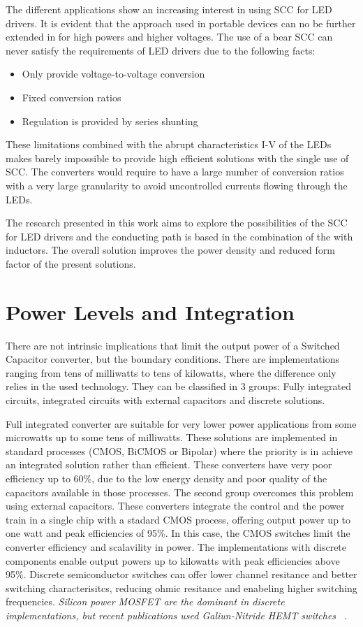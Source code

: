 The different applications show an increasing interest in using SCC for LED drivers. It is evident that the approach used in portable devices can no be further extended in for high powers and higher voltages. The use of a bear SCC can never satisfy the requirements of LED drivers due to the following facts:
\begin{itemize}
  \item Only provide voltage-to-voltage conversion
  \item Fixed conversion ratios
  \item Regulation is provided by series shunting
\end{itemize}
These limitations combined with the abrupt characteristics I-V of the LEDs makes barely impossible to provide high efficient solutions with the single use of SCC. The converters would require to have a large number of conversion ratios with a very large granularity to avoid uncontrolled currents flowing through the LEDs.

The research presented in this work aims to explore the possibilities of the SCC for LED drivers and the conducting path is based in the combination of the with inductors. The overall solution improves the power density and reduced form factor of the present solutions.



\section*{Power Levels and Integration}

There are not intrinsic implications that limit the output power of a Switched Capacitor converter, but the boundary conditions. There are implementations ranging from tens of milliwatts to tens of kilowatts, where the difference only relies in the used technology. They can be classified in 3 groups: Fully integrated circuits, integrated circuits with external capacitors and discrete solutions.

Full integrated converter are suitable for very lower power applications from some microwatts up to some tens of milliwatts. These solutions are implemented in standard processes (CMOS, BiCMOS or Bipolar) where the priority is in achieve an integrated solution rather than efficient. These converters have very poor efficiency up to 60\%, due to the low energy density and poor quality of the capacitors available in those processes. The second group overcomes this problem using external capacitors. These converters integrate the control and the power train in a single chip with a stadard CMOS process, offering  output power up to one watt and peak efficiencies of 95\%. In this case, the CMOS switches limit the converter efficiency and scalavility in power.
The implementations with discrete components enable output powers up to kilowatts with peak efficiencies above 95\%. Discrete semiconductor switches can offer lower channel resitance and better switching characterisitcs, reducing ohmic resitance and enabeling higher switching frequencies.  \emph{ \color{red} Silicon power MOSFET are the dominant in discrete implementations, but recent publications used Galiun-Nitride HEMT switches ~\cite{11Scott,12Scott}}.

